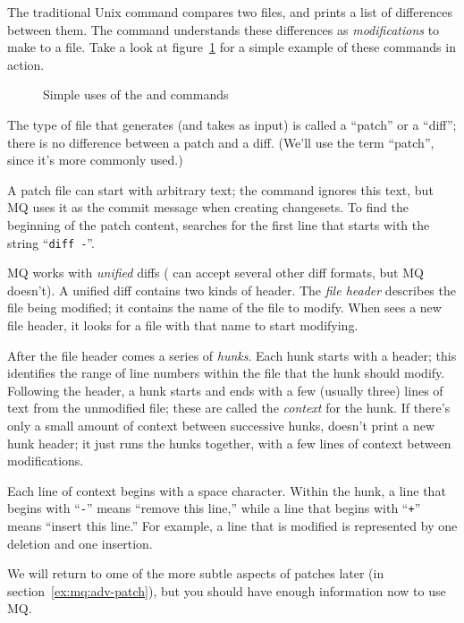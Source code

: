 The traditional Unix  command compares two files, and
prints a list of differences between them. The  command
understands these differences as \emph{modifications} to make to a
file.  Take a look at figure~\ref{ex:mq:diff} for a simple example of
these commands in action.

\begin{figure}[ht]
  \caption{Simple uses of the  and  commands}
  \label{ex:mq:diff}
\end{figure}

The type of file that  generates (and 
takes as input) is called a ``patch'' or a ``diff''; there is no
difference between a patch and a diff.  (We'll use the term ``patch'',
since it's more commonly used.)

A patch file can start with arbitrary text; the 
command ignores this text, but MQ uses it as the commit message when
creating changesets.  To find the beginning of the patch content,
 searches for the first line that starts with the
string ``\texttt{diff~-}''.

MQ works with \emph{unified} diffs ( can accept several
other diff formats, but MQ doesn't).  A unified diff contains two
kinds of header.  The \emph{file header} describes the file being
modified; it contains the name of the file to modify.  When
 sees a new file header, it looks for a file with that
name to start modifying.

After the file header comes a series of \emph{hunks}.  Each hunk
starts with a header; this identifies the range of line numbers within
the file that the hunk should modify.  Following the header, a hunk
starts and ends with a few (usually three) lines of text from the
unmodified file; these are called the \emph{context} for the hunk.  If
there's only a small amount of context between successive hunks,
 doesn't print a new hunk header; it just runs the hunks
together, with a few lines of context between modifications.

Each line of context begins with a space character.  Within the hunk,
a line that begins with ``\texttt{-}'' means ``remove this line,''
while a line that begins with ``\texttt{+}'' means ``insert this
line.''  For example, a line that is modified is represented by one
deletion and one insertion.

We will return to ome of the more subtle aspects of patches later (in
section~\ref{ex:mq:adv-patch}), but you should have enough information
now to use MQ.

